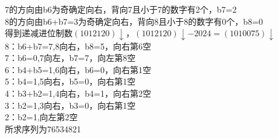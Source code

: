 \documentclass[a4paper,12pt]{article}
\begin{document}
	7的方向由b6为奇确定向右，背向7且小于7的数字有2个，b7=2\\
	8的方向由b6+b7=3为奇确定向右，背向8且小于8的数字有0个，b8=0\\
	得到递减进位制数$(1012120)\downarrow$，$(1012120)\downarrow-2024=(1010075)\downarrow$\\
	8：b6+b7=7,8向右，b8=5，向右第6空\\
	7：b6=0,7向左，b7=7，向左第8空\\
	6：b4+b5=1,6向右，b6=0，向右第1空\\
	5：b4=1,5向右，b5=0，向右第1空\\
	4：b3+b2=1,4向右，b4=1，向右第2空\\
	3：b2=1,3向右，b3=0，向右第1空\\
	2：b2=1,向左第2空\\
	所求序列为76534821\\
\end{document}
